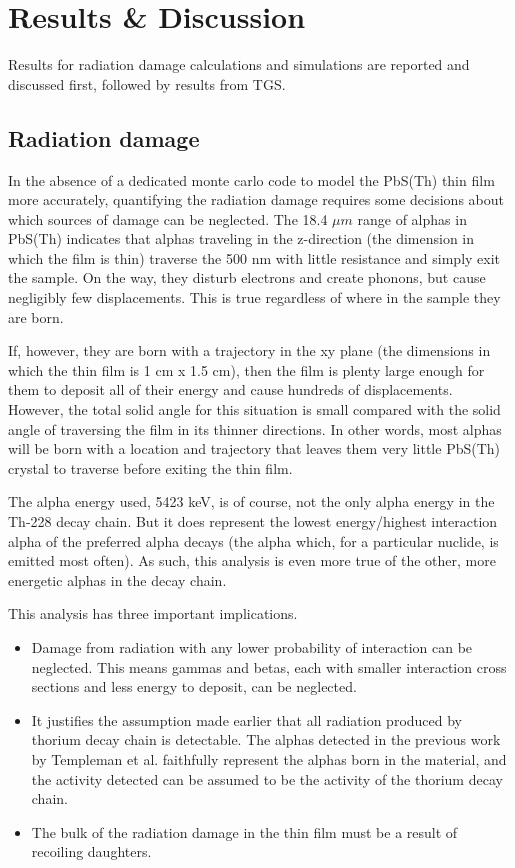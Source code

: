 \chapter{Results \& Discussion}
Results for radiation damage calculations and simulations are reported and discussed first, followed by results from TGS.

\section{Radiation damage}
In the absence of a dedicated monte carlo code to model the PbS(Th) thin film more accurately, quantifying the radiation damage requires some decisions about which sources of damage can be neglected. The 18.4 $\mu m$ range of alphas in PbS(Th) indicates that alphas traveling in the z-direction (the dimension in which the film is thin) traverse the 500 nm with little resistance and simply exit the sample. On the way, they disturb electrons and create phonons, but cause negligibly few displacements. This is true regardless of where in the sample they are born.

If, however, they are born with a trajectory in the xy plane (the dimensions in which the thin film is 1 cm x 1.5 cm), then the film is plenty large enough for them to deposit all of their energy and cause hundreds of displacements. However, the total solid angle for this situation is small compared with the solid angle of traversing the film in its thinner directions. In other words, most alphas will be born with a location and trajectory that leaves them very little PbS(Th) crystal to traverse before exiting the thin film.

The alpha energy used, 5423 keV, is of course, not the only alpha energy in the Th-228 decay chain. But it does represent the lowest energy/highest interaction alpha of the preferred alpha decays (the alpha which, for a particular nuclide, is emitted most often). As such, this analysis is even more true of the other, more energetic alphas in the decay chain.

This analysis has three important implications. 
\begin{itemize}
\item Damage from radiation with any lower probability of interaction can be neglected. This means gammas and betas, each with smaller interaction cross sections and less energy to deposit, can be neglected.
\item It justifies the assumption made earlier that all radiation produced by thorium decay chain is detectable. The alphas detected in the previous work by Templeman et al. faithfully represent the alphas born in the material, and the activity detected can be assumed to be the activity of the thorium decay chain.
\item The bulk of the radiation damage in the thin film must be a result of recoiling daughters.
\end{itemize}


